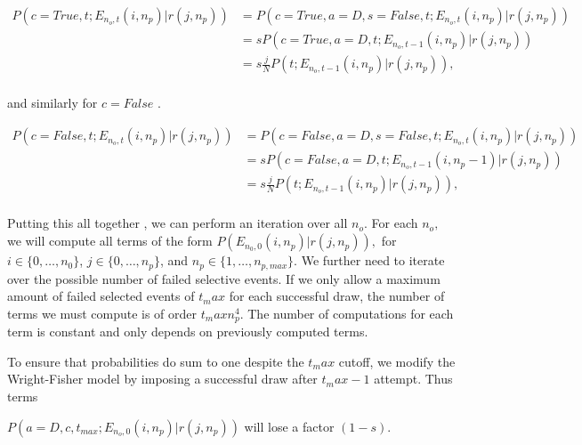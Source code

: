 \documentclass[review]{elsarticle}
\newcommand{\sgcomment}[1]{{\color{red}{SG: #1}}}
\begin{document}
\sgcomment{I think this might want to be: }
 \begin{equation}
\begin{split}
P(c=True, t;  E_{n_o,t}(i,n_p) | r(j, n_p)) &= P(c=True, a=D, s=False, t;  E_{n_o,t}(i,n_p) | r(j, n_p))\\
&= s P(c=True, a=D, t;  E_{n_o,t-1}(i,n_p) | r(j, n_p))\\
&= s \frac{j}{N} P( t;  E_{n_o,t-1}(i,n_p) | r(j, n_p)),\\
\end{split}
\end{equation}


and similarly for $c=False$ \sgcomment{Write out? TODO, not complete}.  

 \begin{equation}
\begin{split}
P(c=False, t;  E_{n_o,t}(i,n_p) | r(j, n_p)) &= P(c=False, a=D, s=False, t;  E_{n_o,t}(i,n_p) | r(j, n_p))\\
&= s P(c=False, a=D, t;  E_{n_o,t-1}(i,n_p-1) | r(j, n_p))\\
&= s \frac{j}{N} P( t;  E_{n_o,t-1}(i,n_p) | r(j, n_p)),\\
\end{split}
\end{equation}




Putting this all together \sgcomment{pseudocode?}, we can perform an iteration over all $n_o.$ For
each $n_o,$ we will compute all terms of the form $P(E_{n_0,0}(i,n_p) | r(j, n_p)),$ for
$i\in\{0,\ldots,n_0\}$, $j\in \{0,\ldots,n_p\}$, and $n_p \in\{1,\ldots,n_{p,max}\}.$ We further
need to iterate over the possible number of failed selective events. If we only allow a maximum
amount of failed selected events of $t_max$ for each successful draw, the number of terms we must
compute is of order $t_max n_p^4$. The number of computations for each term is constant and only
depends on previously computed terms.

To ensure that probabilities do sum to one despite the $t_max$ cutoff, we modify the Wright-Fisher model by imposing a successful draw after $t_max-1$ attempt. Thus terms

$P(a=D,c,t_{max}; E_{n_o,0}(i,n_p)  | r(j, n_p))$ will lose a factor $(1-s)$.   






\end{document}
